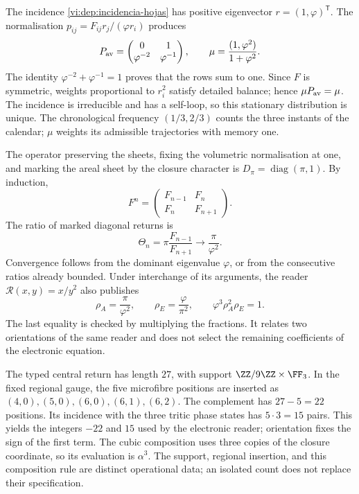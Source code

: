 The incidence \eqref{vi:dep:incidencia-hojas} has positive eigenvector
\(r=(1,\varphi)^{\mathsf T}\). The normalisation
\(p_{ij}=F_{ij}r_j/(\varphi r_i)\) produces
\[
 P_{\rm av}=\begin{pmatrix}0&1\\\varphi^{-2}&\varphi^{-1}\end{pmatrix},
 \qquad \mu=\frac{(1,\varphi^2)}{1+\varphi^2}.
\]
The identity \(\varphi^{-2}+\varphi^{-1}=1\) proves that the rows
sum to one. Since \(F\) is symmetric, weights proportional to
\(r_i^2\) satisfy detailed balance; hence \(\mu P_{\rm av}=\mu\).
The incidence is irreducible and has a self-loop, so
this stationary distribution is unique. The chronological frequency
\((1/3,2/3)\) counts the three instants of the calendar; \(\mu\)
weights its admissible trajectories with memory one.

The operator preserving the sheets, fixing the volumetric normalisation
at one, and marking the areal sheet by the closure character is
\(D_\pi=\operatorname{diag}(\pi,1)\). By induction,
\[
 F^n=\begin{pmatrix}F_{n-1}&F_n\\F_n&F_{n+1}\end{pmatrix}.
\]
The ratio of marked diagonal returns is
\[
 \Theta_n=\pi\frac{F_{n-1}}{F_{n+1}}
 \longrightarrow\frac{\pi}{\varphi^2}.
\]
Convergence follows from the dominant eigenvalue \(\varphi\), or from
the consecutive ratios already bounded. Under interchange of its arguments, the reader
\(\mathcal R(x,y)=x/y^2\)
also publishes
\begin{equation}
 \rho_A=\frac{\pi}{\varphi^2},\qquad
 \rho_E=\frac{\varphi}{\pi^2},\qquad
 \varphi^3\rho_A^2\rho_E=1.
 \label{vi:dep:dos-orientaciones}
\end{equation}
The last equality is checked by multiplying the fractions.
It relates two orientations of the same reader and does not select the
remaining coefficients of the electronic equation.

The typed central return has length \(27\), with support
\(\ZZ/9\ZZ\times\FF_3\). In the fixed regional gauge, the five microfibre
positions are inserted as
\((4,0),(5,0),(6,0),(6,1),(6,2)\).
The complement has \(27-5=22\) positions. Its incidence with the
three tritic phase states has \(5\cdot3=15\) pairs.
This yields the integers \(-22\) and \(15\) used by the
electronic reader; orientation fixes the sign of the first term.
The cubic composition uses three copies of the closure coordinate,
so its evaluation is \(\alpha^3\). The support, regional
insertion, and this composition rule are distinct operational data;
an isolated count does not replace their specification.

